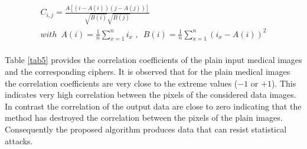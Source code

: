 \documentclass[journal]{IEEEtran/IEEEtran}
\begin{document}
\begin{equation}\label{eq20}
\begin{array}{l}
 {C_{i,j}} = \frac{{A[(i - A(i))(j - A(j))]}}{{\sqrt {B(i)} \sqrt {B(j)} }} \\ 
 with\,\,\,A(i) = \frac{1}{n}\sum\limits_{x = 1}^n {{i_x}} \,\,,\,\,\,B(i) = \frac{1}{n}\sum\limits_{x = 1}^n {{{({i_x} - A(i))}^2}}  \\ 
 \end{array}
\end{equation}

Table \ref{tab5} provides the correlation coefficients of the plain input medical images and the corresponding ciphers. It is observed that for the plain medical images the correlation coefficients are very close to the extreme values ($-1$ or $+1$). This indicates very high correlation between the pixels of the considered data images. In contrast the correlation of the output data are close to zero indicating that the method has destroyed the correlation between the pixels of the plain images. Consequently the proposed algorithm produces data that can resist statistical attacks.

\begin{table}
	\centering
	\caption{Security performances of the proposed work.}
	\label{tab5}
\end{table}
\end{document}

